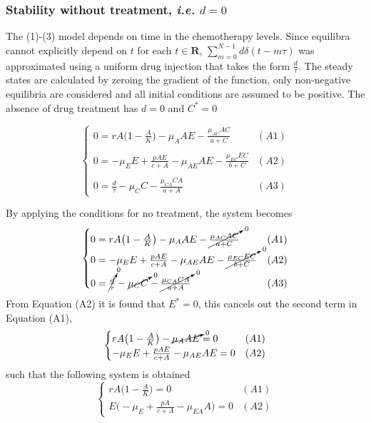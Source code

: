 \subsubsection{Stability without treatment, \textit{i.e.} $d=0$}
The (1)-(3) model depends on time in the chemotherapy levels. Since equilibra cannot explicitly depend on $t$ for each $t\in \mathbf{R}$, $\sum_{m=0}^{N-1} d\delta(t - m\tau)$ was approximated using a uniform drug injection that takes the form $\frac{d}{\tau}$. 
The steady states are calculated by zeroing the gradient of the function, only non-negative equilibria are considered and all initial conditions are assumed to be positive.
The absence of drug treatment has $d=0$ and $C^*=0$

\[
	\begin{cases}
	0 = rA \bigl( 1 - \frac{A}{K} \bigr) - \mu_A AE - \frac{\mu_{AC} AC}{a+C} & (A1)\\ \\ 
	0 = -\mu_E E + \frac{pAE}{c+A} - \mu_{AE} AE - \frac{\mu_{EC} EC}{b+C} & (A2) \\ \\
	0 = \frac{d}{\tau} - \mu_CC - \frac{\mu_{CA} CA}{a+A} & (A3) 
	\end{cases} 
\]

By applying the conditions for no treatment, the system becomes
\[
	\begin{cases}
		0 = rA \bigl( 1 - \frac{A}{K} \bigr) - \mu_A AE - \cancelto{0}{\frac{\mu_{AC} AC}{a+C}} & (A1)\\  
		0 = -\mu_E E + \frac{pAE}{c+A} - \mu_{AE} AE - \cancelto{0}{\frac{\mu_{EC} EC}{b+C}} & (A2) \\ 
		0 = \cancelto{0}{\frac{d}{\tau}} - \cancelto{0}{\mu_CC} - \cancelto{0}{\frac{\mu_{CA} CA}{a+A}} & (A3) 
	\end{cases} 
\]
From Equation (A2) it is found that $E^*=0$, this cancels out the second term in Equation (A1),
\[
	\begin{cases}
		rA \bigl( 1 - \frac{A}{K} \bigr) - \cancelto{0}{\mu_A AE} = 0 & (A1)\\ 
		-\mu_E E + \frac{pAE}{c+A} - \mu_{AE} AE  = 0 & (A2) 
	\end{cases} 
\]
such that the following system is obtained
\[ 
	\begin{cases}
		rA \bigl( 1 - \frac{A}{K} \bigr) = 0 & (A1) \\
		E \bigl( -\mu_E + \frac{pA}{c+A} - \mu_{EA}A \bigr) = 0 & (A2) 
	\end{cases}
\]

